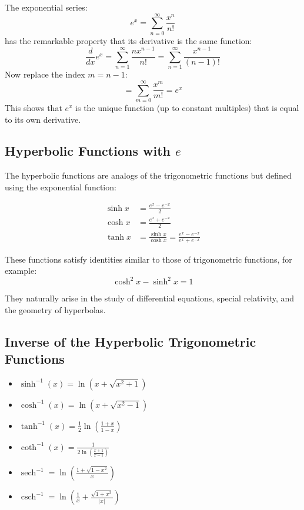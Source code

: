 The exponential series:
\[
e^x = \sum_{n=0}^{\infty} \frac{x^n}{n!}
\]
has the remarkable property that its derivative is the same function:
\[
\frac{d}{dx} e^x = \sum_{n=1}^{\infty} \frac{n x^{n-1}}{n!} = \sum_{n=1}^{\infty} \frac{x^{n-1}}{(n-1)!}
\]
Now replace the index \(m = n - 1\):
\[
= \sum_{m=0}^{\infty} \frac{x^m}{m!} = e^x
\]
This shows that \(e^x\) is the unique function (up to constant multiples) that is equal to its own derivative.

\subsection{Hyperbolic Functions with \texorpdfstring{\(e\)}{e}}

The hyperbolic functions are analogs of the trigonometric functions but defined using the exponential function:

\begin{align*}
\sinh x &= \frac{e^x - e^{-x}}{2} \\
\cosh x &= \frac{e^x + e^{-x}}{2} \\
\tanh x &= \frac{\sinh x}{\cosh x} = \frac{e^x - e^{-x}}{e^x + e^{-x}}
\end{align*}

These functions satisfy identities similar to those of trigonometric functions, for example:
\[
\cosh^2 x - \sinh^2 x = 1
\]

They naturally arise in the study of differential equations, special relativity, and the geometry of hyperbolas.

\subsection{Inverse of the Hyperbolic Trigonometric Functions}

\begin{itemize}[label=\(-\)]
    \item \(\sinh^{-1}(x) = \ln(x + \sqrt{x^2 + 1})\)
    \item \(\cosh^{-1}(x) = \ln(x + \sqrt{x^2 - 1})\)
    \item \(\tanh^{-1}(x) = \frac{1}{2} \ln\left(\frac{1 + x}{1 - x}\right)\)
    \item \(\coth^{-1}(x) = \frac{1}{2 \ln\left(\frac{x + 1}{x - 1}\right)}\)
    \item \(\operatorname{sech}^{-1} = \ln\left(\frac{1 + \sqrt{1 - x^2}}{x}\right)\)
    \item \(\operatorname{csch}^{-1} = \ln\left( \frac{1}{x} + \frac{\sqrt{1 + x^2}}{|x|}\right)\) 
\end{itemize}